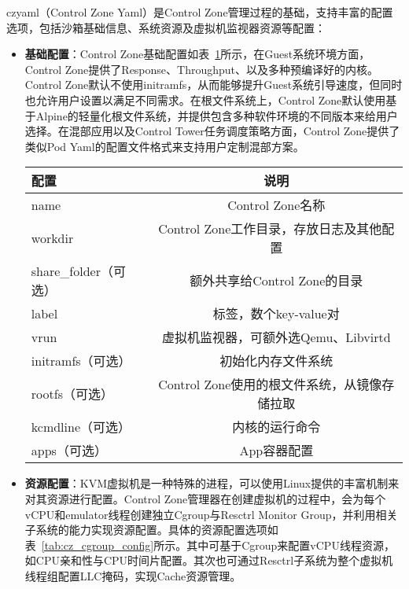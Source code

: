czyaml（Control Zone Yaml）是Control Zone管理过程的基础，支持丰富的配置选项，包括沙箱基础信息、系统资源及虚拟机监视器资源等配置：

\begin{itemize}
    \item \textbf{基础配置}：Control Zone基础配置如表~\ref{tab:cz_meta_config}所示，在Guest系统环境方面，Control Zone提供了Response、Throughput、以及多种预编译好的内核。Control Zone默认不使用initramfs，从而能够提升Guest系统引导速度，但同时也允许用户设置以满足不同需求。在根文件系统上，Control Zone默认使用基于Alpine的轻量化根文件系统，并提供包含多种软件环境的不同版本来给用户选择。在混部应用以及Control Tower任务调度策略方面，Control Zone提供了类似Pod Yaml的配置文件格式来支持用户定制混部方案。
    
\begin{table}[H]
    \label{tab:cz_meta_config}
    \footnotesize%
    \setlength{\tabcolsep}{4pt}%
    \renewcommand{\arraystretch}{1.25}%
    \centering
    \begin{tabular}{lc}
        \hline
        配置 & 说明\\
        \hline
        name & Control Zone名称 \\
        workdir & Control Zone工作目录，存放日志及其他配置 \\
        share\_folder（可选） & 额外共享给Control Zone的目录 \\
        label & 标签，数个key-value对 \\
        vrun & 虚拟机监视器，可额外选Qemu、Libvirtd \\
        initramfs（可选） & 初始化内存文件系统 \\
        rootfs（可选） & Control Zone使用的根文件系统，从镜像存储拉取\\
        kcmdline（可选） & 内核的运行命令 \\
        apps（可选） & App容器配置 \\
        \hline
    \end{tabular}
\end{table}

    \item \textbf{资源配置}：KVM虚拟机是一种特殊的进程，可以使用Linux提供的丰富机制来对其资源进行配置。Control Zone管理器在创建虚拟机的过程中，会为每个vCPU和emulator线程创建独立Cgroup与Resctrl Monitor Group，并利用相关子系统的能力实现资源配置。具体的资源配置选项如表~\ref{tab:cz_cgroup_config}所示。其中可基于Cgroup来配置vCPU线程资源，如CPU亲和性与CPU时间片配置。其次也可通过Resctrl子系统为整个虚拟机线程组配置LLC掩码，实现Cache资源管理。


\end{itemize}
